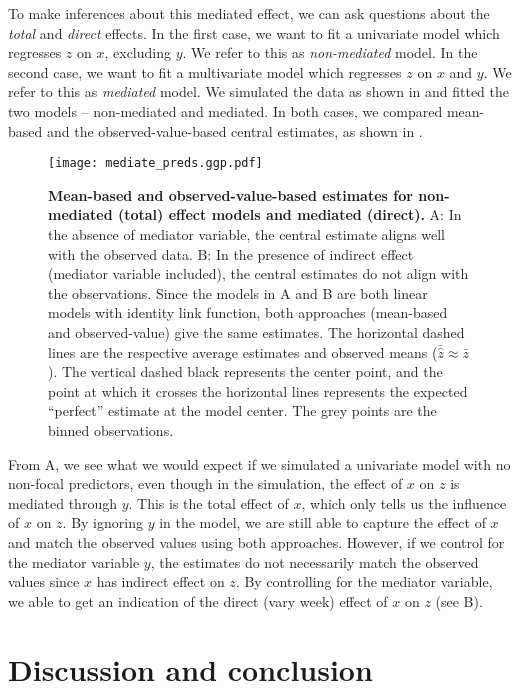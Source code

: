 To make inferences about this mediated effect, we can ask questions about the \emph{total} and \emph{direct} effects. In the first case, we want to fit a univariate model which regresses $z$ on $x$, excluding $y$. We refer to this as \emph{non-mediated} model. In the second case, we want to fit a multivariate model which regresses $z$ on $x$ and $y$. We refer to this as \emph{mediated} model. We simulated the data as shown in  and fitted the two models -- non-mediated and mediated. In both cases, we compared mean-based and the observed-value-based central estimates, as shown in .
%
\begin{figure}
\begin{center}
\texttt{[image: mediate\_preds.ggp.pdf]}
\end{center}
\caption{{\bf Mean-based and observed-value-based estimates for non-mediated (total) effect models and mediated (direct).} A: In the absence of mediator variable, the central estimate aligns well with the observed data. B: In the presence of indirect effect (mediator variable included), the central estimates do not align with the observations. Since the models in A and B are both linear models with identity link function, both approaches (mean-based and observed-value) give the same estimates. The horizontal dashed lines are the respective average estimates and observed means ($\bar{\hat{z}} \approx \bar{z}$). The vertical dashed black represents the center point, and the point at which it crosses the horizontal lines represents the expected ``perfect'' estimate at the model center. The grey points are the binned observations.}
\label{fig:pred_mediated_plots}
\end{figure}
%
From A, we see what we would expect if we simulated a univariate model with no non-focal predictors, even though in the simulation, the effect of $x$ on $z$ is mediated through $y$. This is the total effect of $x$, which only tells us the influence of $x$ on $z$. By ignoring $y$ in the model, we are still able to capture the effect of $x$ and match the observed values using both approaches. However, if we control for the mediator variable $y$, the estimates do not necessarily match the observed values since $x$ has indirect effect on $z$. By controlling for the mediator variable, we able to get an indication of the direct (vary week) effect of $x$ on $z$ (see B).


\section{Discussion and conclusion}

